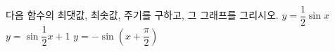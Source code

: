 다음 함수의 최댓값, 최솟값, 주기를 구하고, 그 그래프를 그리시오.
 $y=\dfrac{1}{2}\sin x$
 $y=\sin\dfrac{1}{2}x+1$
 $y=-\sin\left(x+\dfrac{\pi}{2}\right)$
